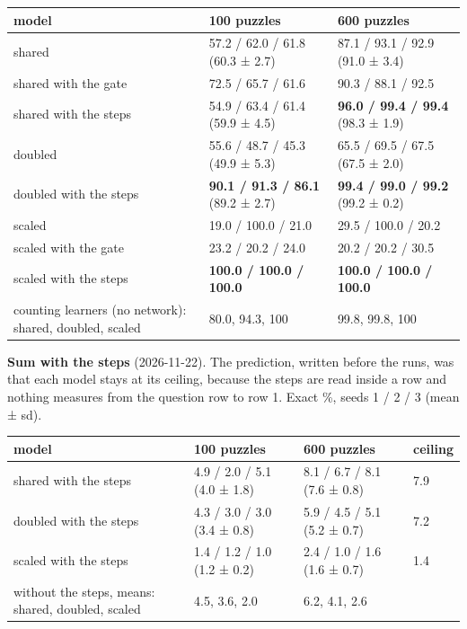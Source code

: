 \begin{center}\small
\begin{tabularx}{\linewidth}{@{}YYY@{}}
\toprule
model & 100 puzzles & 600 puzzles \\
\midrule
shared & 57.2 / 62.0 / 61.8 (60.3 ± 2.7) & 87.1 / 93.1 / 92.9 (91.0 ± 3.4) \\
shared with the gate & 72.5 / 65.7 / 61.6 & 90.3 / 88.1 / 92.5 \\
shared with the steps & 54.9 / 63.4 / 61.4 (59.9 ± 4.5) & \textbf{96.0 / 99.4 / 99.4} (98.3 ± 1.9) \\
doubled & 55.6 / 48.7 / 45.3 (49.9 ± 5.3) & 65.5 / 69.5 / 67.5 (67.5 ± 2.0) \\
doubled with the steps & \textbf{90.1 / 91.3 / 86.1} (89.2 ± 2.7) & \textbf{99.4 / 99.0 / 99.2} (99.2 ± 0.2) \\
scaled & 19.0 / 100.0 / 21.0 & 29.5 / 100.0 / 20.2 \\
scaled with the gate & 23.2 / 20.2 / 24.0 & 20.2 / 20.2 / 30.5 \\
scaled with the steps & \textbf{100.0 / 100.0 / 100.0} & \textbf{100.0 / 100.0 / 100.0} \\
counting learners (no network): shared, doubled, scaled & 80.0, 94.3, 100 & 99.8, 99.8, 100 \\
\bottomrule
\end{tabularx}
\end{center}

\textbf{Sum with the steps} (2026-11-22). The prediction, written before the runs, was that each model stays at its ceiling, because the steps are read inside a row and nothing measures from the question row to row 1. Exact \%, seeds 1 / 2 / 3 (mean ± sd).

\begin{center}\small
\begin{tabularx}{\linewidth}{@{}YYYl@{}}
\toprule
model & 100 puzzles & 600 puzzles & ceiling \\
\midrule
shared with the steps & 4.9 / 2.0 / 5.1 (4.0 ± 1.8) & 8.1 / 6.7 / 8.1 (7.6 ± 0.8) & 7.9 \\
doubled with the steps & 4.3 / 3.0 / 3.0 (3.4 ± 0.8) & 5.9 / 4.5 / 5.1 (5.2 ± 0.7) & 7.2 \\
scaled with the steps & 1.4 / 1.2 / 1.0 (1.2 ± 0.2) & 2.4 / 1.0 / 1.6 (1.6 ± 0.7) & 1.4 \\
without the steps, means: shared, doubled, scaled & 4.5, 3.6, 2.0 & 6.2, 4.1, 2.6 &  \\
\bottomrule
\end{tabularx}
\end{center}

